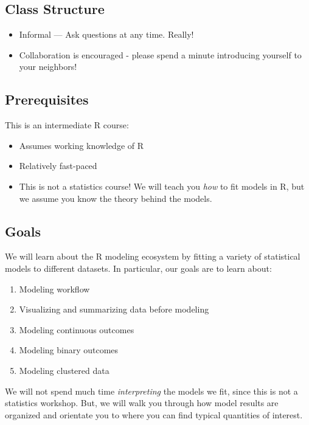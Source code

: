 \documentclass[
]{book}
\providecommand{\tightlist}{%
  \setlength{\itemsep}{0pt}\setlength{\parskip}{0pt}}
\begin{document}
\hypertarget{class-structure-1}{%
\subsection{Class Structure}\label{class-structure-1}}

\begin{itemize}
\tightlist
\item
  Informal --- Ask questions at any time. Really!
\item
  Collaboration is encouraged - please spend a minute introducing yourself to your neighbors!
\end{itemize}

\hypertarget{prerequisites-1}{%
\subsection{Prerequisites}\label{prerequisites-1}}

This is an intermediate R course:

\begin{itemize}
\tightlist
\item
  Assumes working knowledge of R
\item
  Relatively fast-paced
\item
  This is not a statistics course! We will teach you \emph{how} to fit models in R,
  but we assume you know the theory behind the models.
\end{itemize}

\hypertarget{goals-1}{%
\subsection{Goals}\label{goals-1}}

We will learn about the R modeling ecosystem by fitting a variety of statistical models to
different datasets. In particular, our goals are to learn about:

\begin{enumerate}
\def\labelenumi{\arabic{enumi}.}
\tightlist
\item
  Modeling workflow
\item
  Visualizing and summarizing data before modeling
\item
  Modeling continuous outcomes
\item
  Modeling binary outcomes
\item
  Modeling clustered data
\end{enumerate}

We will not spend much time \emph{interpreting} the models we fit, since this is not a statistics workshop.
But, we will walk you through how model results are organized and orientate you to where you can find
typical quantities of interest.
\end{document}
